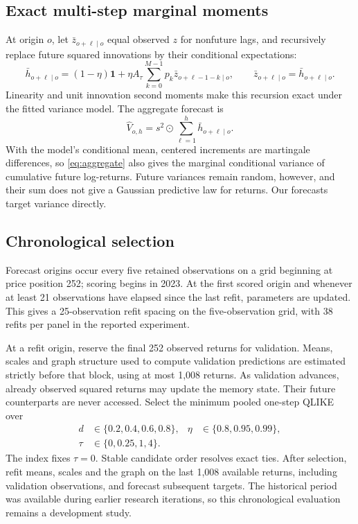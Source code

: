 \documentclass[12pt,a4paper]{article}
\newcommand{\one}{\mathbf 1}
\begin{document}
\subsection{Exact multi-step marginal moments}
At origin $o$, let $\bar z_{o+\ell\mid o}$ equal observed $z$ for nonfuture lags,
and recursively replace future squared innovations by their conditional
expectations:
\begin{equation}
\bar h_{o+\ell\mid o}
=(1-\eta)\one+\eta A_\tau
\sum_{k=0}^{M-1}p_k\bar z_{o+\ell-1-k\mid o},\qquad
\bar z_{o+\ell\mid o}=\bar h_{o+\ell\mid o}.
\end{equation}
Linearity and unit innovation second moments make this recursion exact under
the fitted variance model. The aggregate forecast is
\begin{equation}
\widehat V_{o,h}=s^2\odot\sum_{\ell=1}^{h}\bar h_{o+\ell\mid o}.
\label{eq:aggregate}
\end{equation}
With the model's conditional mean, centered increments are martingale
differences, so \eqref{eq:aggregate} also gives the marginal conditional
variance of cumulative future log-returns. Future variances remain random,
however, and their sum does not give a Gaussian predictive law for returns.
Our forecasts target variance directly.

\subsection{Chronological selection}
Forecast origins occur every five retained observations on a grid beginning at
price position 252; scoring begins in 2023. At the first scored origin and whenever
at least 21 observations have elapsed since the last refit, parameters are
updated. This gives a 25-observation refit spacing on the five-observation grid,
with 38 refits per panel in the reported experiment.

At a refit origin, reserve the final 252 observed returns for validation. Means,
scales and graph structure used to compute validation predictions are estimated
strictly before that block, using at most 1,008 returns. As validation advances,
already observed squared returns may update the memory state. Their future
counterparts are never accessed. Select the minimum pooled one-step QLIKE over
\begin{align}
d&\in\{0.2,0.4,0.6,0.8\}, &\eta&\in\{0.8,0.95,0.99\},\\
\tau&\in\{0,0.25,1,4\}.&&
\end{align}
The index fixes $\tau=0$. Stable candidate order resolves exact ties. After
selection, refit means, scales and the graph on the last 1,008 available returns,
including validation observations, and forecast subsequent targets.
The historical period was available during earlier research iterations, so
this chronological evaluation remains a development study.
\end{document}
